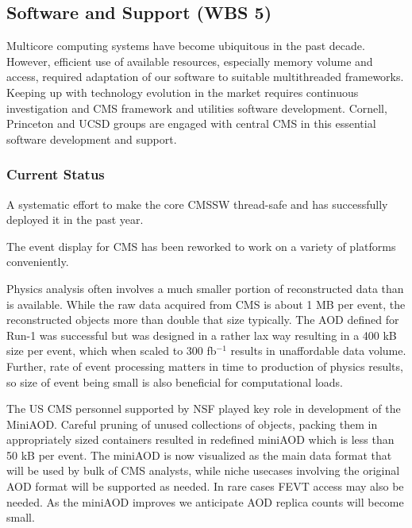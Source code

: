 \documentclass[11pt,a4paper]{article}
\begin{document}
\subsection{Software and Support (WBS 5)}

Multicore computing systems have become ubiquitous in the past
decade. However, efficient use of available resources, especially
memory volume and access, required adaptation of our software to
suitable multithreaded frameworks. Keeping up with technology
evolution in the market requires continuous investigation and CMS
framework and utilities software development.  Cornell, Princeton and
UCSD groups are engaged with central CMS in this essential software
development and support.

\subsubsection{Current Status}


A systematic effort to make the core CMSSW thread-safe and has
successfully deployed it in the past year.  


The event display
for CMS has been reworked to work on a variety of platforms
conveniently.


Physics analysis often involves a much smaller portion of
reconstructed data than is available. While the raw data acquired from
CMS is about 1 MB per event, the reconstructed objects more than
double that size typically. The AOD defined for Run-1 was successful
but was designed in a rather lax way resulting in a 400 kB size per
event, which when scaled to 300 fb$^{-1}$ results in unaffordable
data volume. Further, rate of event processing matters in time to
production of physics results, so size of event being small is also
beneficial for computational loads. 

The US CMS personnel supported by NSF played key role in development
of the MiniAOD.  Careful pruning of unused collections of objects, packing them
in appropriately sized containers resulted in redefined miniAOD which
is less than 50 kB per event. The miniAOD is now visualized as the main data format that will
be used by bulk of CMS analysts, while niche usecases involving the
original AOD format will be supported as needed. In rare cases FEVT
access may also be needed.  As the miniAOD improves we anticipate AOD
replica counts will become small. 
\end{document}
